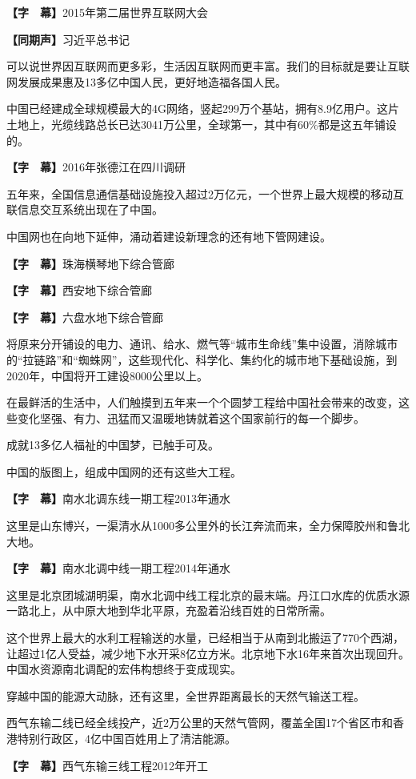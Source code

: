 \documentclass{ctexart}
\newcommand{\zkh}[1]{\textbf{\hspace{-2.7em} 【#1】}}
\begin{document}
 \zkh{字　幕}2015年第二届世界互联网大会

 \zkh{同期声}习近平总书记

可以说世界因互联网而更多彩，生活因互联网而更丰富。我们的目标就是要让互联网发展成果惠及13多亿中国人民，更好地造福各国人民。

 
中国已经建成全球规模最大的4G网络，竖起299万个基站，拥有8.9亿用户。这片土地上，光缆线路总长已达3041万公里，全球第一，其中有60{\%}都是这五年铺设的。

 \zkh{字　幕}2016年张德江在四川调研

 
五年来，全国信息通信基础设施投入超过2万亿元，一个世界上最大规模的移动互联信息交互系统出现在了中国。

 中国网也在向地下延伸，涌动着建设新理念的还有地下管网建设。

 \zkh{字　幕}珠海横琴地下综合管廊

 \zkh{字　幕}西安地下综合管廊

 \zkh{字　幕}六盘水地下综合管廊

 
将原来分开铺设的电力、通讯、给水、燃气等``城市生命线''集中设置，消除城市的``拉链路''和``蜘蛛网''，这些现代化、科学化、集约化的城市地下基础设施，到2020年，中国将开工建设8000公里以上。

在最鲜活的生活中，人们触摸到五年来一个个圆梦工程给中国社会带来的改变，这些变化坚强、有力、迅猛而又温暖地铸就着这个国家前行的每一个脚步。

 成就13多亿人福祉的中国梦，已触手可及。

 中国的版图上，组成中国网的还有这些大工程。

 \zkh{字　幕}南水北调东线一期工程2013年通水

 
这里是山东博兴，一渠清水从1000多公里外的长江奔流而来，全力保障胶州和鲁北大地。

 \zkh{字　幕}南水北调中线一期工程2014年通水

 
这里是北京团城湖明渠，南水北调中线工程北京的最末端。丹江口水库的优质水源一路北上，从中原大地到华北平原，充盈着沿线百姓的日常所需。

这个世界上最大的水利工程输送的水量，已经相当于从南到北搬运了770个西湖，让超过1亿人受益，减少地下水开采8亿立方米。北京地下水16年来首次出现回升。中国水资源南北调配的宏伟构想终于变成现实。

 穿越中国的能源大动脉，还有这里，全世界距离最长的天然气输送工程。

西气东输二线已经全线投产，近2万公里的天然气管网，覆盖全国17个省区市和香港特别行政区，4亿中国百姓用上了清洁能源。

 \zkh{字　幕}西气东输三线工程2012年开工
\end{document}
